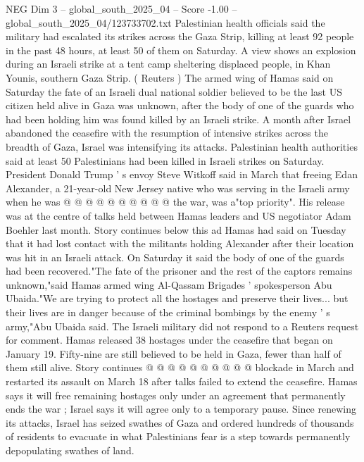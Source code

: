 \begin{textsample}{NEG Dim 3 – global\_south\_2025\_04 – Score -1.00 – global\_south\_2025\_04/123733702.txt}  \label{ex:f3_neg_346}
Palestinian health officials said the military had escalated its strikes across the Gaza Strip, killing at least 92 people in the past 48 hours, at least 50 of them on Saturday.
A view shows an explosion during an Israeli strike at a tent camp sheltering displaced people, in Khan Younis, southern Gaza Strip. ( Reuters ) The armed wing of Hamas said on Saturday the fate of an Israeli dual national soldier believed to be the last US citizen held alive in Gaza was unknown, after the body of one of the guards who had been holding him was found killed by an Israeli strike.
A month after Israel abandoned the ceasefire with the resumption of intensive strikes across the breadth of Gaza, Israel was intensifying its attacks.
Palestinian health authorities said at least 50 Palestinians had been killed in Israeli strikes on Saturday.
President Donald Trump ' s envoy Steve Witkoff said in March that freeing Edan Alexander, a 21-year-old New Jersey native who was serving in the Israeli army when he was @ @ @ @ @ @ @ @ @ @ the war, was a"top priority".
His release was at the centre of talks held between Hamas leaders and US negotiator Adam Boehler last month.
Story continues below this ad Hamas had said on Tuesday that it had lost contact with the militants holding Alexander after their location was hit in an Israeli attack.
On Saturday it said the body of one of the guards had been recovered."The fate of the prisoner and the rest of the captors remains unknown,"said Hamas armed wing Al-Qassam Brigades ' spokesperson Abu Ubaida."We are trying to protect all the hostages and preserve their lives... but their lives are in danger because of the criminal bombings by the enemy ' s army,"Abu Ubaida said.
The Israeli military did not respond to a Reuters request for comment.
Hamas released 38 hostages under the ceasefire that began on January 19.
Fifty-nine are still believed to be held in Gaza, fewer than half of them still alive.
Story continues @ @ @ @ @ @ @ @ @ @ blockade in March and restarted its assault on March 18 after talks failed to extend the ceasefire.
Hamas says it will free remaining hostages only under an agreement that permanently ends the war ; Israel says it will agree only to a temporary pause.
Since renewing its attacks, Israel has seized swathes of Gaza and ordered hundreds of thousands of residents to evacuate in what Palestinians fear is a step towards permanently depopulating swathes of land.

\end{textsample}

